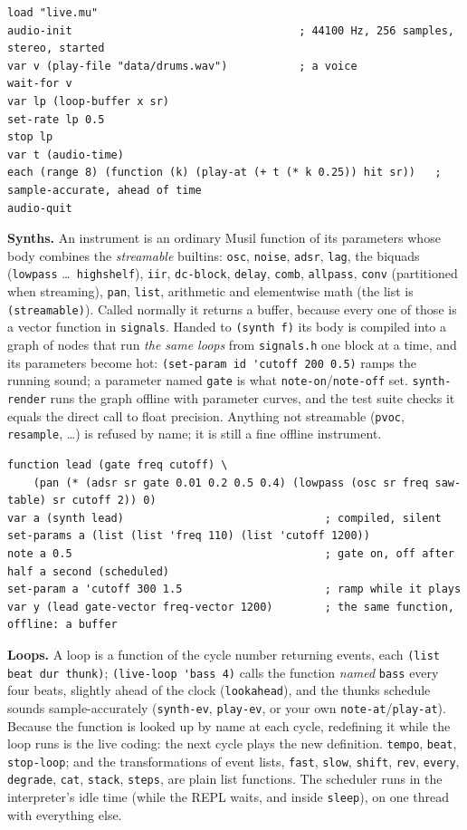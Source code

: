 \documentclass[11pt,a4paper]{article}
\newcommand{\musil}[1]{\lstinline[style=musilinline]{#1}}
\begin{document}
\begin{lstlisting}
load "live.mu"
audio-init                                   ; 44100 Hz, 256 samples, stereo, started
var v (play-file "data/drums.wav")           ; a voice
wait-for v
var lp (loop-buffer x sr)
set-rate lp 0.5
stop lp
var t (audio-time)
each (range 8) (function (k) (play-at (+ t (* k 0.25)) hit sr))   ; sample-accurate, ahead of time
audio-quit
\end{lstlisting}

\textbf{Synths.} An instrument is an ordinary Musil function of its parameters whose
body combines the \emph{streamable} builtins: \musil{osc}, \musil{noise}, \musil{adsr},
\musil{lag}, the biquads (\musil{lowpass} \ldots\ \musil{highshelf}), \musil{iir},
\musil{dc-block}, \musil{delay}, \musil{comb}, \musil{allpass}, \musil{conv} (partitioned
when streaming), \musil{pan}, \musil{list}, arithmetic and elementwise math (the list is
\musil{(streamable)}). Called normally it returns a buffer, because every one of those is
a vector function in \texttt{signals}. Handed to \musil{(synth f)} its body is compiled
into a graph of nodes that run \emph{the same loops} from \texttt{signals.h} one block at
a time, and its parameters become hot: \musil{(set-param id 'cutoff 200 0.5)} ramps the
running sound; a parameter named \musil{gate} is what \musil{note-on}/\musil{note-off}
set. \musil{synth-render} runs the graph offline with parameter curves, and the test suite
checks it equals the direct call to float precision. Anything not streamable
(\musil{pvoc}, \musil{resample}, \ldots) is refused by name; it is still a fine offline
instrument.

\begin{lstlisting}
function lead (gate freq cutoff) \
    (pan (* (adsr sr gate 0.01 0.2 0.5 0.4) (lowpass (osc sr freq saw-table) sr cutoff 2)) 0)
var a (synth lead)                               ; compiled, silent
set-params a (list (list 'freq 110) (list 'cutoff 1200))
note a 0.5                                       ; gate on, off after half a second (scheduled)
set-param a 'cutoff 300 1.5                      ; ramp while it plays
var y (lead gate-vector freq-vector 1200)        ; the same function, offline: a buffer
\end{lstlisting}

\textbf{Loops.} A loop is a function of the cycle number returning events, each
\musil{(list beat dur thunk)}; \musil{(live-loop 'bass 4)} calls the function \emph{named}
\musil{bass} every four beats, slightly ahead of the clock (\musil{lookahead}), and the
thunks schedule sounds sample-accurately (\musil{synth-ev}, \musil{play-ev}, or your own
\musil{note-at}/\musil{play-at}). Because the function is looked up by name at each cycle,
redefining it while the loop runs is the live coding: the next cycle plays the new
definition. \musil{tempo}, \musil{beat}, \musil{stop-loop}; and the transformations of
event lists, \musil{fast}, \musil{slow}, \musil{shift}, \musil{rev}, \musil{every},
\musil{degrade}, \musil{cat}, \musil{stack}, \musil{steps}, are plain list functions.
The scheduler runs in the interpreter's idle time (while the REPL waits,
and inside \musil{sleep}), on one thread with everything else.
\end{document}
